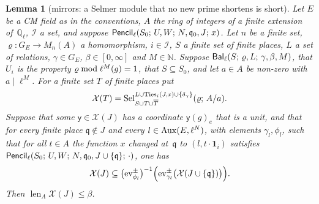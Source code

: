 \documentclass[11pt,a4paper]{article}
\newcommand{\len}{\operatorname{len}}
\newcommand{\m}[1]{\mbox{$#1$}}        %
\theoremstyle{plainx}
\newtheorem{lemma}[theorem]{Lemma}
\theoremstyle{uprightx}
\newcommand{\NN}{\mathbb{N}}
\newcommand{\Ql}{\mathbb{Q}_\ell}
\newcommand{\GE}[1]{G_{#1}}
\newcommand{\Sel}[4]{\operatorname{Sel}_{#2}^{#3}(#1;\,#4)}
\newcommand{\fq}{\mathfrak{q}}
\begin{document}
\begin{lemma}[mirrors: a Selmer module that no new prime shortens is short]\label{l:unseen}
Let $E$ be a CM field as in the conventions, $A$ the ring of integers of a finite extension of~\m{\Ql},
$\mathcal{I}$ a set, and suppose \m{\IsPencil{\ell}{S_0}{U}{W}{N}{\fq_0}{J}{x}}. Let $n$ be a finite set,
\m{\varrho\colon\GE{E}\to M_n(A)} a homomorphism, \m{i\in\mathcal{I}}, $S$ a finite set of finite places, $L$ a set of
relations, \m{\gamma\in\GE{E}}, \m{\beta\in[0,\infty]} and \m{M\in\NN}. Suppose
\m{\IsBalanced{\ell}{S}{\varrho}{L}{\gamma}{\beta}{M}}, that $U_i$ is the property
\m{\reduceModPow{\ell}{M}{\varrho}(g)=1}, that \m{S\subseteq S_0}, and let \m{a\in A} be non-zero with
\m{a\mid\ell^{M}}. For a finite set $T$ of finite places put
\[
\mathcal{X}(T)=\Sel{\varrho}{\unionWithConj{S}{T}}{L\cup\tieRelations{J}{x}{i}\cup\{\delta_\gamma\}}{A/a}.
\]
Suppose that some \m{\mathsf{y}\in\mathcal{X}(J)} has a coordinate \m{\mathsf{y}(g)_e} that is a unit, and that for every finite place
\m{\fq\notin J} and every \m{l\in\AuxPrimeData{E}{\ell^{N}}}, with elements \m{\gamma_l,\phi_l}, such that for all
\m{t\in A} the function $x$ changed at~$\fq$ to \m{(l,t\cdot\mathbf{1}_i)} satisfies
\m{\IsPencil{\ell}{S_0}{U}{W}{N}{\fq_0}{J\cup\{\fq\}}{\cdot}}, one has
\[
\mathcal{X}(J)\subseteq\bigl(\evalConjPair{\phi_l}\bigr)^{-1}\Bigl(\evalConjPair{\gamma_l}\bigl(\mathcal{X}(J\cup\{\fq\})\bigr)\Bigr).
\]
Then \m{\len_A\mathcal{X}(J)\le\beta}.
\end{lemma}
\end{document}
